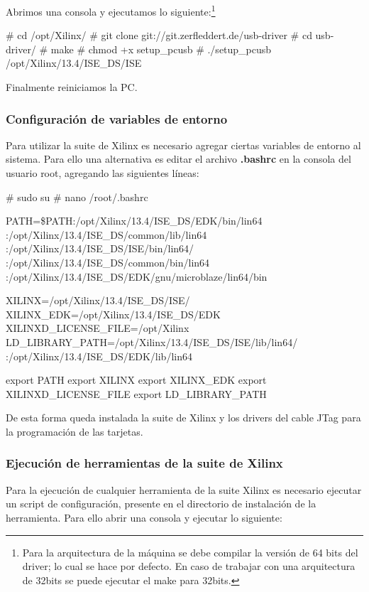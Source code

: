 Abrimos una consola y ejecutamos lo siguiente:\footnote{Para la arquitectura de la máquina se debe compilar la versión de 64 bits del driver; lo cual se hace por defecto. En caso de trabajar con una arquitectura de 32bits se puede ejecutar el make para 32bits.}

\begin{bash}
# cd /opt/Xilinx/
# git clone git://git.zerfleddert.de/usb-driver
# cd usb-driver/
# make
# chmod +x setup_pcusb
# ./setup_pcusb /opt/Xilinx/13.4/ISE_DS/ISE
\end{bash}

Finalmente reiniciamos la PC.

\subsubsection{Configuración de variables de entorno}
Para utilizar la suite de Xilinx es necesario agregar ciertas variables de entorno al sistema. Para ello una alternativa es editar el archivo \textbf{.bashrc} en la consola del usuario root, agregando las siguientes líneas:

\begin{bash}
# sudo su
# nano /root/.bashrc

PATH=\$PATH:/opt/Xilinx/13.4/ISE_DS/EDK/bin/lin64
:/opt/Xilinx/13.4/ISE_DS/common/lib/lin64
:/opt/Xilinx/13.4/ISE_DS/ISE/bin/lin64/
:/opt/Xilinx/13.4/ISE_DS/common/bin/lin64
:/opt/Xilinx/13.4/ISE_DS/EDK/gnu/microblaze/lin64/bin

XILINX=/opt/Xilinx/13.4/ISE_DS/ISE/
XILINX_EDK=/opt/Xilinx/13.4/ISE_DS/EDK
XILINXD_LICENSE_FILE=/opt/Xilinx
LD_LIBRARY_PATH=/opt/Xilinx/13.4/ISE_DS/ISE/lib/lin64/
:/opt/Xilinx/13.4/ISE_DS/EDK/lib/lin64

export PATH
export XILINX
export XILINX_EDK
export XILINXD_LICENSE_FILE
export LD_LIBRARY_PATH
\end{bash}

De esta forma queda instalada la suite de Xilinx y los drivers del cable JTag para la programación de las tarjetas.

\subsubsection{Ejecución de herramientas de la suite de Xilinx}
Para la ejecución de cualquier herramienta de la suite Xilinx es necesario ejecutar un script de configuración, presente en el directorio de instalación de la herramienta. Para ello abrir una consola y ejecutar lo siguiente:

